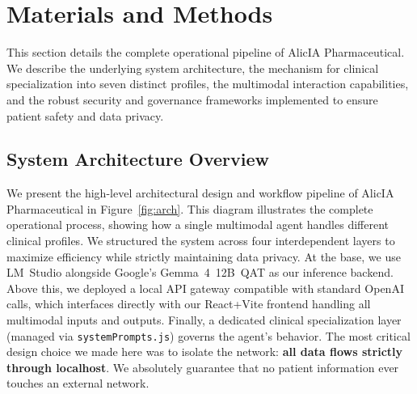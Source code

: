\documentclass[9pt,conference]{IEEEtran}
\begin{document}
\section{Materials and Methods}
\label{sec:methods}

This section details the complete operational pipeline of AlicIA Pharmaceutical. We describe the underlying system architecture, the mechanism for clinical specialization into seven distinct profiles, the multimodal interaction capabilities, and the robust security and governance frameworks implemented to ensure patient safety and data privacy.

\subsection{System Architecture Overview}
\label{subsec:system}

We present the high-level architectural design and workflow pipeline of AlicIA Pharmaceutical in Figure~\ref{fig:arch}. This diagram illustrates the complete operational process, showing how a single multimodal agent handles different clinical profiles. We structured the system across four interdependent layers to maximize efficiency while strictly maintaining data privacy. At the base, we use LM~Studio alongside Google's Gemma~4~12B~QAT as our inference backend. Above this, we deployed a local API gateway compatible with standard OpenAI calls, which interfaces directly with our React+Vite frontend handling all multimodal inputs and outputs. Finally, a dedicated clinical specialization layer (managed via \texttt{systemPrompts.js}) governs the agent's behavior. The most critical design choice we made here was to isolate the network: \textbf{all data flows strictly through localhost}. We absolutely guarantee that no patient information ever touches an external network.
\end{document}
